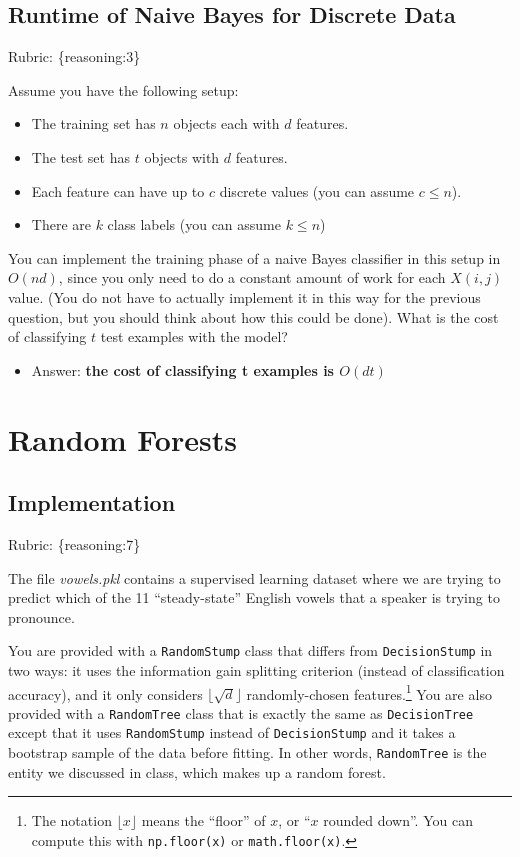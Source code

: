 \documentclass{article}
\def\blu#1{{\color{blu}#1}}
\def\gre#1{{\color{gre}#1}}
\def\items#1{\begin{itemize}#1\end{itemize}}
\def\rubric#1{\gre{Rubric: \{#1\}}}{}
\begin{document}
\subsection{Runtime of Naive Bayes for Discrete Data} 
\rubric{reasoning:3}

Assume you have the following setup:
\items{
\item The training set has $n$ objects each with $d$ features.
\item The test set has $t$ objects with $d$ features.
\item Each feature can have up to $c$ discrete values (you can assume $c \leq n$).
\item There are $k$ class labels (you can assume $k \leq n$)
}
You can implement the training phase of a naive Bayes classifier in this setup in $O(nd)$, since you only need to do a constant amount of work for each $X(i,j)$ value. (You do not have to actually implement it in this way for the previous question, but you should think about how this could be done). \blu{What is the cost of classifying $t$ test examples with the model?}
\items {
\item Answer: \bf {the cost of classifying t examples is $O(dt)$}
}

\section{Random Forests}

\subsection{Implementation}
\rubric{reasoning:7}

The file \emph{vowels.pkl} contains a supervised learning dataset where we are trying to predict which of the 11 ``steady-state'' English vowels that a speaker is trying to pronounce.

You are provided with a \texttt{RandomStump} class that differs from
\texttt{DecisionStump} in two ways: it uses the information gain splitting criterion
(instead of classification accuracy), and
it only considers $\lfloor \sqrt{d} \rfloor$ randomly-chosen features.\footnote{The notation $\lfloor x\rfloor$ means the ``floor'' of $x$, or ``$x$ rounded down''. You can compute this with \texttt{np.floor(x)} or \texttt{math.floor(x)}.}
You are also provided with a \texttt{RandomTree} class that is exactly the same as
\texttt{DecisionTree} except that it uses \texttt{RandomStump} instead of
\texttt{DecisionStump} and it takes a bootstrap sample of the data before fitting.
In other words, \texttt{RandomTree} is the entity we discussed in class, which
makes up a random forest.
\end{document}

